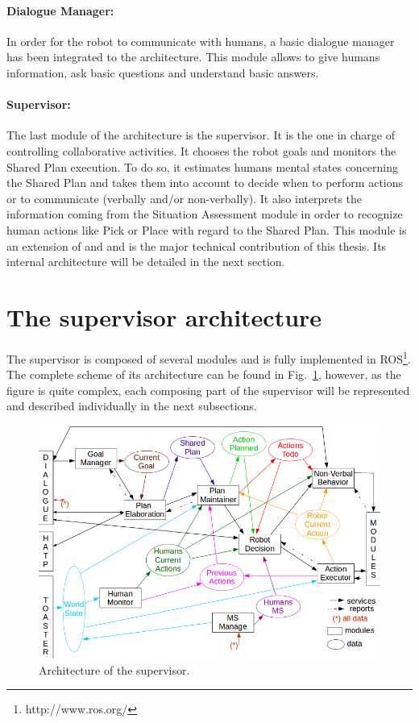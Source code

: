 \documentclass[english,a4paper,11pt,twoside]{StyleThese}
\begin{document}
\paragraph{Dialogue Manager:}
In order for the robot to communicate with humans, a basic dialogue manager has been integrated to the architecture. This module allows to give humans information, ask basic questions and understand basic answers.

\paragraph{Supervisor:}
The last module of the architecture is the supervisor. It is the one in charge of controlling collaborative activities. It chooses the robot goals and monitors the Shared Plan execution. To do so, it estimates humans mental states concerning the Shared Plan and takes them into account to decide when to perform actions or to communicate (verbally and/or non-verbally). It also interprets the information coming from the Situation Assessment module in order to recognize human actions like Pick or Place with regard to the Shared Plan. This module is an extension of \cite{clodic2009shary} and \cite{fiore2016planning} and is the major technical contribution of this thesis. Its internal architecture will be detailed in the next section.

\section{The supervisor architecture}

The supervisor is composed of several modules and is fully implemented in ROS\footnote{http://www.ros.org/}. The complete scheme of its architecture can be found in Fig.~\ref{fig:archiSup}, however, as the figure is quite complex, each composing part of the supervisor will be represented and described individually in the next subsections. 

\begin{figure}[!h]
	\centering
    \includegraphics[width=\textwidth]{figs/Chapter2/ArchiSup.png}
    \caption{Architecture of the supervisor.}
    \label{fig:archiSup}
\end{figure}
\end{document}
